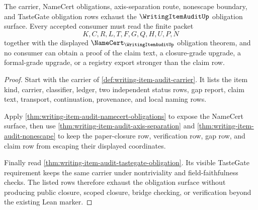 \begin{theorem}
\label{thm:writing-item-audit-obligation-closure-route}
The carrier, NameCert obligations, axis-separation route, nonescape boundary, and TasteGate obligation rows exhaust the $\WritingItemAuditUp$ obligation surface. Every accepted consumer must read the finite packet
$$
K,C,R,L,T,F,G,Q,H,U,P,N
$$
together with the displayed $\NameCert_{\WritingItemAuditUp}$ obligation theorem, and no consumer can obtain a proof of the claim text, a closure-grade upgrade, a formal-grade upgrade, or a registry export stronger than the claim row.
\end{theorem}
\begin{proof}
Start with the carrier of \autoref{def:writing-item-audit-carrier}. It lists the item kind, carrier, classifier, ledger, two independent status rows, gap report, claim text, transport, continuation, provenance, and local naming rows.

Apply \autoref{thm:writing-item-audit-namecert-obligations} to expose the NameCert surface, then use \autoref{thm:writing-item-audit-axis-separation} and \autoref{thm:writing-item-audit-nonescape} to keep the paper-closure row, verification row, gap row, and claim row from escaping their displayed coordinates.

Finally read \autoref{thm:writing-item-audit-tastegate-obligation}. Its visible TasteGate requirement keeps the same carrier under nontriviality and field-faithfulness checks. The listed rows therefore exhaust the obligation surface without producing public closure, scoped closure, bridge checking, or verification beyond the existing Lean marker.
\end{proof}

